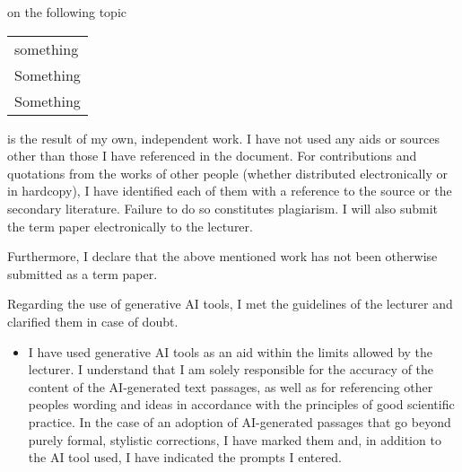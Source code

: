 {\vspace{-0.1cm}

on the following topic

\vspace{-0.25cm}

\begin{center}
    \begin{tabularx}{0.975\textwidth}{|X|}
    \hline
    something\\
    Something\\
    Something\\
    \hline
\end{tabularx}
\end{center}


\vspace{0.3cm}


is the result of my own, independent work. I have not used any aids or sources other than those I have referenced in the document. For contributions and quotations from the works of other people (whether distributed electronically or in hardcopy), I have identified each of them with a reference to the source or the secondary literature. Failure to do so constitutes plagiarism. I will also submit the term paper electronically to the lecturer.\\

\vspace{\baselineskip}

Furthermore, I declare that the above mentioned work has not been
otherwise submitted as a term paper.\\

\vspace{\baselineskip}

Regarding the use of generative AI tools, I met the guidelines of the
lecturer and clarified them in case of doubt.


\def\LayoutCheckField#1#2{%
  #2 #1%
}

\begin{itemize}
    \item[\mbox{\begin{Form}\CheckBox[height=0.2cm, width=0.2cm]{}\end{Form}}] I have used generative AI tools as an aid within the limits allowed by the lecturer. I understand that I am solely responsible for the accuracy of the content of the AI-generated text passages, as well as for referencing other people\textquotesingle s wording and ideas in accordance with the principles of good scientific practice. In the case of an adoption of AI-generated passages that go beyond purely formal, stylistic corrections, I have marked them and, in addition to the AI tool used, I have indicated the prompts I entered.
    

\end{itemize}}

